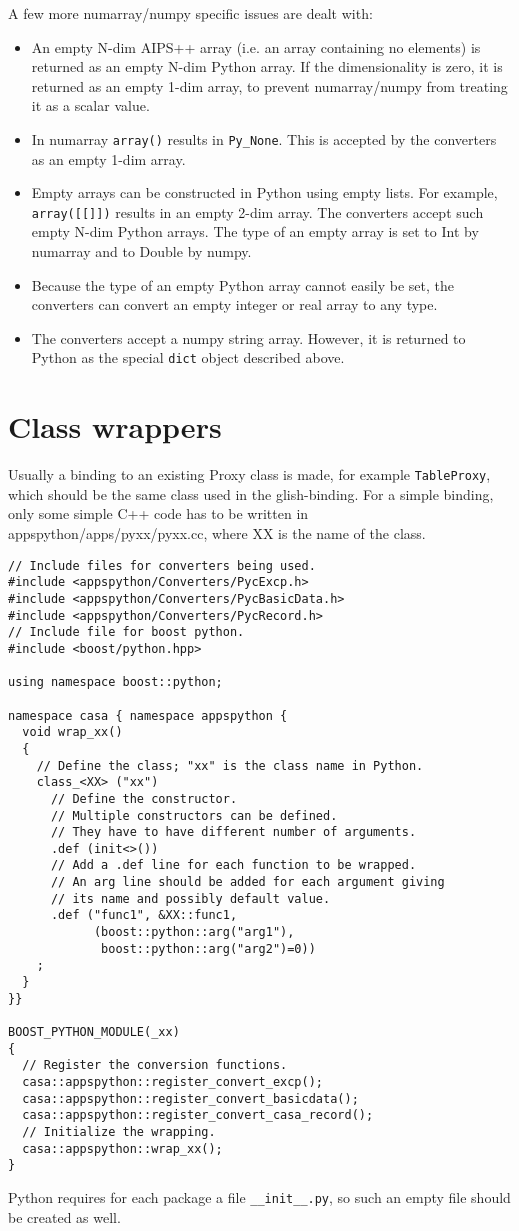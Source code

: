 A few more numarray/numpy specific issues are dealt with:
\begin{itemize}
\item An empty N-dim AIPS++ array (i.e. an array containing no elements) is
returned as an empty N-dim Python array. If the dimensionality is
zero, it is returned as an empty 1-dim array, to prevent numarray/numpy
from treating it as a scalar value.
\item In numarray \texttt{array()} results in \texttt{Py\_None}. This
is accepted by the converters as an empty 1-dim array.
\item Empty arrays can be constructed in Python using empty lists. For
example, \texttt{array([[]])} results in an empty 2-dim array. The
converters accept such empty N-dim Python arrays. The type of an empty
array is set to Int by numarray and to Double by numpy.
\item Because the type of an empty Python array cannot easily be set,
the converters can convert an empty integer or real array to any type.
\item The converters accept a numpy string array. However, it is
returned to Python as the special \texttt{dict} object described above.
\end{itemize}

\section{Class wrappers}
Usually a binding to an existing Proxy class is made, for example
\texttt{TableProxy}, which should be the same class used in the
glish-binding. 
For a simple binding, only some simple C++ code has to be written in
appspython/apps/pyxx/pyxx.cc, where XX is the name of the class.
\begin{verbatim}
// Include files for converters being used.
#include <appspython/Converters/PycExcp.h>
#include <appspython/Converters/PycBasicData.h>
#include <appspython/Converters/PycRecord.h>
// Include file for boost python.
#include <boost/python.hpp>

using namespace boost::python;

namespace casa { namespace appspython {
  void wrap_xx()
  {
    // Define the class; "xx" is the class name in Python.
    class_<XX> ("xx")
      // Define the constructor.
      // Multiple constructors can be defined.
      // They have to have different number of arguments.
      .def (init<>())
      // Add a .def line for each function to be wrapped.
      // An arg line should be added for each argument giving
      // its name and possibly default value.
      .def ("func1", &XX::func1,
            (boost::python::arg("arg1"),
             boost::python::arg("arg2")=0))
    ;
  }
}}

BOOST_PYTHON_MODULE(_xx)
{
  // Register the conversion functions.
  casa::appspython::register_convert_excp();
  casa::appspython::register_convert_basicdata();
  casa::appspython::register_convert_casa_record();
  // Initialize the wrapping.
  casa::appspython::wrap_xx();
}
\end{verbatim}
Python requires for each package a file \texttt{\_\_init\_\_.py},
so such an empty file should be created as well.

